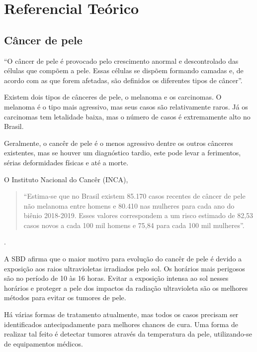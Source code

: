 
\chapter[Referencial Teórico]{Referencial Teórico}

\section{Câncer de pele}

    ``O câncer de pele é provocado pelo crescimento anormal e descontrolado das células que compõem a pele. Essas células se dispõem formando camadas e, de acordo com as que forem afetadas, são definidos os diferentes tipos de câncer''\cite{sbd}.
    
    Existem dois tipos de cânceres de pele, o melanoma e os carcinomas. O melanoma é o tipo mais agressivo, mas seus casos são relativamente raros. Já os carcinomas tem letalidade baixa, mas  o número de casos é extremamente alto no Brasil.
    
    Geralmente, o cancêr de pele é o menos agressivo dentre os outros cânceres existentes, mas se houver um diagnóstico tardio, este pode levar a ferimentos, sérias deformidades físicas e até a morte.
    
               
    O Instituto Nacional do Cancêr (INCA), \begin{quotation}
    
    
    
    ``Estima-se que no Brasil existem 85.170 casos recentes de câncer de pele não melanoma entre homens e 80.410 nas mulheres para cada ano do biênio 2018-2019. Esses valores correspondem a um risco estimado de 82,53 casos novos a cada 100 mil homens e 75,84 para cada 100 mil mulheres''\cite[p.54]{Estimativa}.
  \end{quotation}
    .%
              
    A SBD afirma que  o maior motivo para evolução do cancêr de pele é devido a exposição aos raios ultravioletas irradiados pelo sol. Os horários mais perigosos são no período de 10 às 16 horas. Evitar a exposição intensa ao sol nesses horários e proteger a pele dos impactos da radiação ultravioleta são os melhores métodos para evitar os tumores de pele.%

 


 Há várias formas de tratamento atualmente, mas todos os casos precisam ser identificados antecipadamente para melhores chances de cura. Uma forma de realizar tal feito  é detectar tumores através da temperatura da pele, utilizando-se de equipamentos médicos.
 
